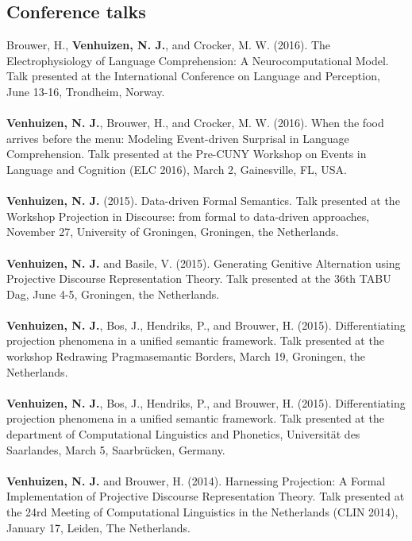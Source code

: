 \documentclass[a4paper,10pt]{article}
\begin{document}
\subsection*{Conference talks}

\noindent
    Brouwer, H., \textbf{Venhuizen, N. J.}, and Crocker, M. W. (2016). The
    Electrophysiology of Language Comprehension: A Neurocomputational Model.
    Talk presented at the International Conference on Language and Perception,
    June 13-16, Trondheim, Norway.\\
    \\
    \textbf{Venhuizen, N. J.}, Brouwer, H., and Crocker, M. W. (2016). When the
    food arrives before the menu: Modeling Event-driven Surprisal in Language
    Comprehension. Talk presented at the Pre-CUNY Workshop on Events in
    Language and Cognition (ELC 2016), March 2, Gainesville, FL, USA.\\
    \\
    \textbf{Venhuizen, N. J.} (2015). Data-driven Formal Semantics. Talk
    presented at the Workshop Projection in Discourse: from formal to
    data-driven approaches, November 27, University of Groningen, Groningen,
    the Netherlands.\\
    \\
    \textbf{Venhuizen, N. J.} and Basile, V. (2015). Generating Genitive
    Alternation using Projective Discourse Representation Theory.
    Talk presented at the 36th TABU Dag, June 4-5, Groningen, the Netherlands.\\
    \\
    \textbf{Venhuizen, N. J.}, Bos, J., Hendriks, P., and Brouwer, H. (2015). 
    Differentiating projection phenomena in a unified semantic framework.
    Talk presented at the workshop Redrawing Pragmasemantic Borders,
    March 19, Groningen, the Netherlands.\\
    \\
    \textbf{Venhuizen, N. J.}, Bos, J., Hendriks, P., and Brouwer, H. (2015). 
    Differentiating projection phenomena in a unified semantic framework.
    Talk presented at the department of Computational Linguistics and Phonetics,
    Universit{\"a}t des Saarlandes, March 5, Saarbr{\"u}cken, Germany.\\
    \\
    \textbf{Venhuizen, N. J.} and Brouwer, H. (2014). Harnessing Projection: A Formal
    Implementation of Projective Discourse Representation Theory. Talk
    presented at the 24rd Meeting of Computational Linguistics in the
    Netherlands (CLIN 2014), January 17, Leiden, The Netherlands.\\
\end{document}
